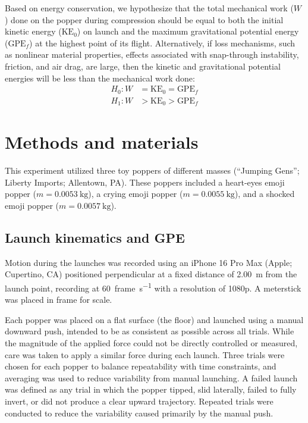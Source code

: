 \documentclass[reprint,amsmath,amssymb,aps,twoside]{revtex4-2} %
\begin{document}
Based on energy conservation, we hypothesize that the total mechanical work ($W$) done on the popper during compression should be equal to both the initial kinetic energy ($\text{KE}_0$) on launch and the maximum gravitational potential energy ($\text{GPE}_f$) at the highest point of its flight. Alternatively, if loss mechanisms, such as nonlinear material properties, effects associated with snap-through instability, friction, and air drag, are large, then the kinetic and gravitational potential energies will be less than the mechanical work done:
\begin{align}
H_0: W &= \text{KE}_0 = \text{GPE}_f \\
H_1: W &> \text{KE}_0 > \text{GPE}_f 
\end{align}








\section{Methods and materials}
This experiment utilized three toy poppers of different masses (``Jumping Gens''; Liberty Imports; Allentown, PA). These poppers included a heart-eyes emoji popper ($m=\qty{0.0053}{\kilo\gram}$), a crying emoji popper ($m=\qty{0.0055}{\kilo\gram}$), and a shocked emoji popper ($m=\qty{0.0057}{\kilo\gram}$). 

\subsection{Launch kinematics and GPE}
Motion during the launches was recorded using an iPhone 16 Pro Max (Apple; Cupertino, CA) positioned perpendicular at a fixed distance of \qty{2.00}{\meter} from the launch point, recording at \qty{60}{frame\per\second} with a resolution of 1080p.  A meterstick was placed in frame for scale. 

Each popper was placed on a flat surface (the floor) and launched using a manual downward push, intended to be as consistent as possible across all trials. While the magnitude of the applied force could not be directly controlled or measured, care was taken to apply a similar force during each launch. Three trials were chosen for each popper to balance repeatability with time constraints, and averaging was used to reduce variability from manual launching. A failed launch was defined as any trial in which the popper tipped, slid laterally, failed to fully invert, or did not produce a clear upward trajectory. Repeated trials were conducted to reduce the variability caused primarily by the manual push.
\end{document}
